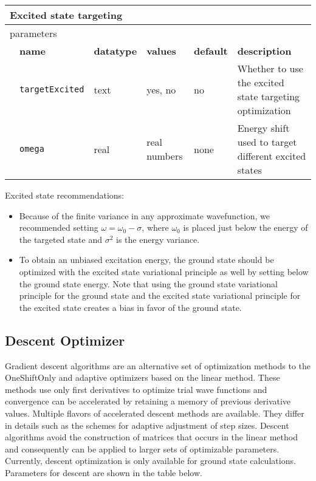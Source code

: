 \begin{table}[h]
\begin{center}
\begin{tabularx}{\textwidth}{l l l l l X }
\hline
\multicolumn{6}{l}{Excited state targeting} \\
\hline
\multicolumn{2}{l}{parameters}  & \multicolumn{4}{l}{}\\
   &   \bfseries name     & \bfseries datatype & \bfseries values & \bfseries default   & \bfseries description \\
   &   \texttt{targetExcited} &  text   & yes, no      & no   & Whether to use the excited state targeting optimization\\
   &   \texttt{omega}         &  real   & real numbers & none & Energy shift used to target different excited states\\
  \hline
\end{tabularx}
\end{center}
\end{table}

Excited state recommendations:
\begin{itemize}
  \item Because of the finite variance in any approximate wavefunction, we recommended setting $\omega=\omega_0-\sigma$, where $\omega_0$ is placed just
        below the energy of the targeted state and $\sigma^2$ is the energy variance.
  \item To obtain an unbiased excitation energy, the ground state should be optimized with the excited state variational principle as well by setting
         below the ground state energy.  Note that using the ground state variational principle for the ground state and the excited state variational
        principle for the excited state creates a bias in favor of the ground state. 
\end{itemize}

\subsection{Descent Optimizer}
Gradient descent algorithms are an alternative set of optimization methods to the OneShiftOnly and adaptive optimizers based on the linear method.
These methods use only first derivatives to optimize trial wave functions and convergence can be accelerated by retaining a memory of previous derivative values.
Multiple flavors of accelerated descent methods are available. They differ in details such as the schemes for adaptive adjustment of step sizes.\cite{Otis2019}
Descent algorithms avoid the construction of matrices that occurs in the linear method and consequently can be applied to larger sets of
optimizable parameters.
Currently, descent optimization is only available for ground state calculations.
Parameters for descent are shown in the table below.\\

